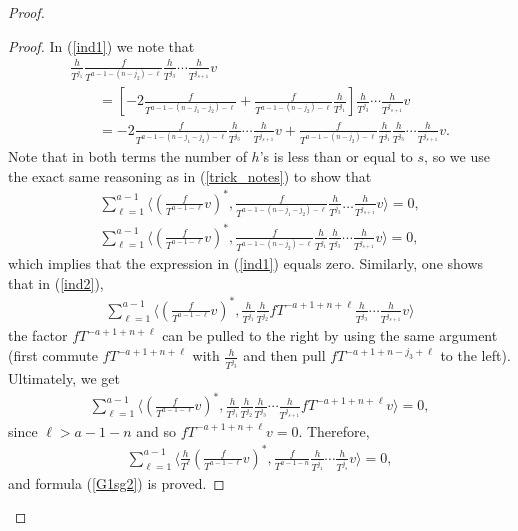\documentclass[11pt]{article}
\numberwithin{equation}{section}
\begin{document}
\begin{proof}
\begin{proof}
In (\ref{ind1}) we note that
\begin{gather*}
\frac{h}{T^{j_1}} \frac{f}{T^{a-1 - (n-j_2) - \ell}} \frac{h}{T^{j_3}} \cdots\frac{h}{T^{j_{s+1}}}v \\
\qquad{} = \left[ -2 \frac{f}{T^{a-1 - (n-j_1-j_2) - \ell}} + \frac{f}{T^{a-1 - (n-j_2) - \ell}}\frac{h}{T^{j_1}} \right] \frac{h}{T^{j_3}} \cdots\frac{h}{T^{j_{s+1}}}v \\
\qquad{} = -2 \frac{f}{T^{a-1 - (n-j_1-j_2) - \ell}} \frac{h}{T^{j_3}} \cdots\frac{h}{T^{j_{s+1}}}v + \frac{f}{T^{a-1 - (n-j_2) - \ell}}\frac{h}{T^{j_1}} \frac{h}{T^{j_3}} \cdots\frac{h}{T^{j_{s+1}}}v.
\end{gather*}
Note that in both terms the number of $h$'s is less than or equal to $s$, so we use the exact same reasoning as in (\ref{trick_notes}) to show that
\begin{gather*}
\sum_{\ell=1}^{a-1} \bigg\langle \left(\frac{f}{T^{a-1-\ell}}v\right)^*, \frac{f}{T^{a-1 - (n-j_1-j_2) - \ell}} \frac{h}{T^{j_3}} \dots\frac{h}{T^{j_{s+1}}}v \bigg\rangle = 0, \\
\sum_{\ell=1}^{a-1} \bigg\langle \left(\frac{f}{T^{a-1-\ell}}v\right)^*, \frac{f}{T^{a-1 - (n-j_2) - \ell}}\frac{h}{T^{j_1}} \frac{h}{T^{j_3}} \cdots\frac{h}{T^{j_{s+1}}}v \bigg\rangle = 0,
\end{gather*}
which implies that the expression in (\ref{ind1}) equals zero. Similarly, one shows that in (\ref{ind2}),
\begin{gather*}
\sum_{\ell=1}^{a-1} \bigg\langle \left(\frac{f}{T^{a-1-\ell}}v\right)^*, \frac{h}{T^{j_1}} \frac{h}{T^{j_2}} fT^{-a+1 + n + \ell} \frac{h}{T^{j_3}} \cdots\frac{h}{T^{j_{s+1}}}v \bigg\rangle
\end{gather*}
the factor $fT^{-a+1 + n + \ell}$ can be pulled to the right by using the same argument (first commute $fT^{-a+1 + n + \ell}$ with $\frac{h}{T^{j_3}}$ and then pull $fT^{-a+1 + n-j_3 + \ell}$ to the left). Ultimately, we get
\begin{gather*}
\sum_{\ell=1}^{a-1} \bigg\langle \left(\frac{f}{T^{a-1-\ell}}v\right)^*, \frac{h}{T^{j_1}} \frac{h}{T^{j_2}} \frac{h}{T^{j_3}} \cdots\frac{h}{T^{j_{s+1}}} fT^{-a+1 + n + \ell} v \bigg\rangle = 0,
\end{gather*}
since $\ell > a-1-n$ and so $fT^{-a+1 + n + \ell} v = 0$. Therefore,
\begin{gather*}
\sum_{\ell=1}^{a-1} \bigg\langle \frac{h}{T^{\ell}} \left(\frac{f}{T^{a-1-\ell}}v\right)^*, \frac{f}{T^{a-1-n}} \frac{h}{T^{j_1}}\cdots\frac{h}{T^{j_{s}}} v \bigg\rangle = 0,
\end{gather*}
and formula (\ref{G1sg2}) is proved.


\end{proof}
\end{proof}
\end{document}
